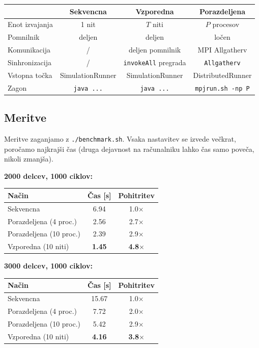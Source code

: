 \documentclass[12pt,a4paper]{article}
\begin{document}
\begin{center}
\begin{tabular}{|l|c|c|c|}
\hline
& \textbf{Sekvencna} & \textbf{Vzporedna} & \textbf{Porazdeljena} \\
\hline
Enot izvajanja & 1 nit & $T$ niti & $P$ procesov \\
Pomnilnik & deljen & deljen & lo\v{c}en \\
Komunikacija & / & deljen pomnilnik & MPI Allgatherv \\
Sinhronizacija & / & \texttt{invokeAll} pregrada & \texttt{Allgatherv} \\
Vstopna to\v{c}ka & SimulationRunner & SimulationRunner & DistributedRunner \\
Zagon & \texttt{java ...} & \texttt{java ...} & \texttt{mpjrun.sh -np P} \\
\hline
\end{tabular}
\end{center}

\subsection{Meritve}

Meritve zaganjamo z \texttt{./benchmark.sh}. Vsaka nastavitev se izvede ve\v{c}krat, poro\v{c}amo najkraj\v{s}i \v{c}as (druga dejavnost na ra\v{c}unalniku lahko \v{c}as samo pove\v{c}a, nikoli zmanj\v{s}a).

\textbf{2000 delcev, 1000 ciklov:}
\begin{center}
\begin{tabular}{|l|c|c|}
\hline
\textbf{Na\v{c}in} & \textbf{\v{C}as [s]} & \textbf{Pohitritev} \\
\hline
Sekvencna & 6.94 & 1.0$\times$ \\
Porazdeljena (4 proc.) & 2.56 & 2.7$\times$ \\
Porazdeljena (10 proc.) & 2.39 & 2.9$\times$ \\
Vzporedna (10 niti) & \textbf{1.45} & \textbf{4.8$\times$} \\
\hline
\end{tabular}
\end{center}

\textbf{3000 delcev, 1000 ciklov:}
\begin{center}
\begin{tabular}{|l|c|c|}
\hline
\textbf{Na\v{c}in} & \textbf{\v{C}as [s]} & \textbf{Pohitritev} \\
\hline
Sekvencna & 15.67 & 1.0$\times$ \\
Porazdeljena (4 proc.) & 7.72 & 2.0$\times$ \\
Porazdeljena (10 proc.) & 5.42 & 2.9$\times$ \\
Vzporedna (10 niti) & \textbf{4.16} & \textbf{3.8$\times$} \\
\hline
\end{tabular}
\end{center}
\end{document}

